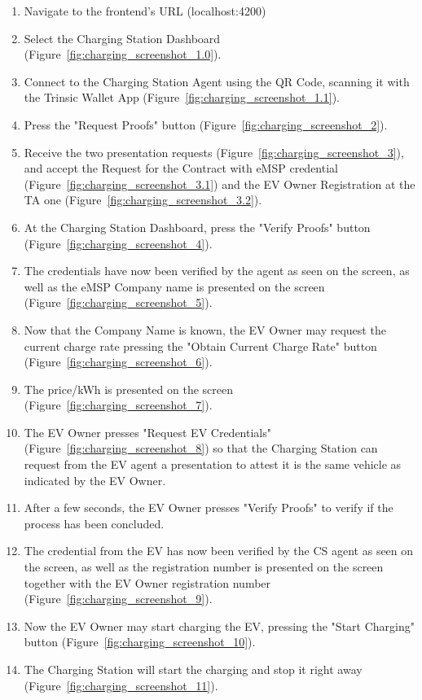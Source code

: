 \begin{enumerate}
    \item Navigate to the frontend's URL (localhost:4200)
    \item Select the Charging Station Dashboard (Figure~\ref{fig:charging_screenshot_1.0}).
    \item Connect to the Charging Station Agent using the QR Code, scanning it with the Trinsic Wallet App (Figure~\ref{fig:charging_screenshot_1.1}).
    \item Press the "Request Proofs" button (Figure~\ref{fig:charging_screenshot_2}).
    \item Receive the two presentation requests (Figure~\ref{fig:charging_screenshot_3}), and accept the Request for the Contract with eMSP credential (Figure~\ref{fig:charging_screenshot_3.1}) and the EV Owner Registration at the TA one (Figure~\ref{fig:charging_screenshot_3.2}).
    \item At the Charging Station Dashboard, press the "Verify Proofs" button (Figure~\ref{fig:charging_screenshot_4}).
    \item The credentials have now been verified by the agent as seen on the screen, as well as the eMSP Company name is presented on the screen (Figure~\ref{fig:charging_screenshot_5}).
    \item Now that the Company Name is known, the EV Owner may request the current charge rate pressing the "Obtain Current Charge Rate" button (Figure~\ref{fig:charging_screenshot_6}).
    \item The price/kWh is presented on the screen (Figure~\ref{fig:charging_screenshot_7}).
    \item The EV Owner presses "Request EV Credentials" (Figure~\ref{fig:charging_screenshot_8}) so that the Charging Station can request from the EV agent a presentation to attest it is the same vehicle as indicated by the EV Owner.
    \item After a few seconds, the EV Owner presses "Verify Proofs" to verify if the process has been concluded.
    \item The credential from the EV has now been verified by the CS agent as seen on the screen, as well as the registration number is presented on the screen together with the EV Owner registration number (Figure~\ref{fig:charging_screenshot_9}).
    \item Now the EV Owner may start charging the EV, pressing the "Start Charging" button (Figure~\ref{fig:charging_screenshot_10}).
    \item The Charging Station will start the charging and stop it right away (Figure~\ref{fig:charging_screenshot_11}).

\end{enumerate}
